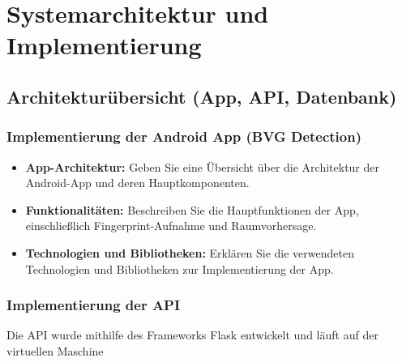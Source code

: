 \chapter{Systemarchitektur und Implementierung}
\section{Architekturübersicht (App, API, Datenbank)}

\subsection{Implementierung der Android App (BVG Detection)}
\begin{itemize}
    \item \textbf{App-Architektur:} Geben Sie eine Übersicht über die Architektur der Android-App und deren Hauptkomponenten.
    \item \textbf{Funktionalitäten:} Beschreiben Sie die Hauptfunktionen der App, einschließlich Fingerprint-Aufnahme und Raumvorhersage.
    \item \textbf{Technologien und Bibliotheken:} Erklären Sie die verwendeten Technologien und Bibliotheken zur Implementierung der App.
\end{itemize}

\subsection{Implementierung der API}

Die API wurde mithilfe des Frameworks Flask entwickelt und läuft auf der virtuellen Maschine

